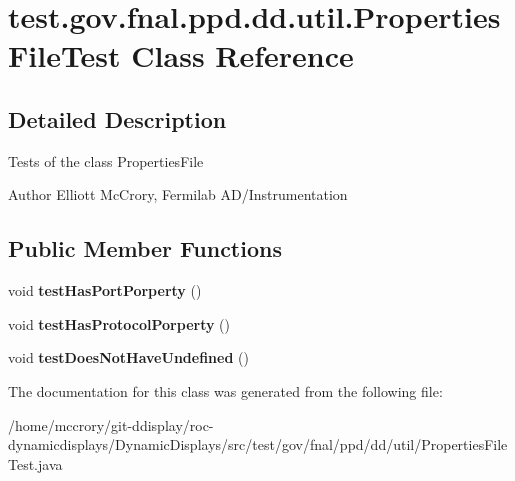 \hypertarget{classtest_1_1gov_1_1fnal_1_1ppd_1_1dd_1_1util_1_1PropertiesFileTest}{\section{test.\-gov.\-fnal.\-ppd.\-dd.\-util.\-Properties\-File\-Test Class Reference}
\label{classtest_1_1gov_1_1fnal_1_1ppd_1_1dd_1_1util_1_1PropertiesFileTest}
}


\subsection{Detailed Description}
Tests of the class Properties\-File

\begin{DoxyAuthor}{Author}
Elliott Mc\-Crory, Fermilab A\-D/\-Instrumentation 
\end{DoxyAuthor}
\subsection*{Public Member Functions}
\begin{DoxyCompactItemize}
\item 
\hypertarget{classtest_1_1gov_1_1fnal_1_1ppd_1_1dd_1_1util_1_1PropertiesFileTest_a8cfbcf6b00fd010a729a7c465d76de77}{void {\bfseries test\-Has\-Port\-Porperty} ()}\label{classtest_1_1gov_1_1fnal_1_1ppd_1_1dd_1_1util_1_1PropertiesFileTest_a8cfbcf6b00fd010a729a7c465d76de77}

\item 
\hypertarget{classtest_1_1gov_1_1fnal_1_1ppd_1_1dd_1_1util_1_1PropertiesFileTest_a111ec29545acfcabc893f8061864db6a}{void {\bfseries test\-Has\-Protocol\-Porperty} ()}\label{classtest_1_1gov_1_1fnal_1_1ppd_1_1dd_1_1util_1_1PropertiesFileTest_a111ec29545acfcabc893f8061864db6a}

\item 
\hypertarget{classtest_1_1gov_1_1fnal_1_1ppd_1_1dd_1_1util_1_1PropertiesFileTest_a81f9e60cdf7be477c8bfa619f600e4b4}{void {\bfseries test\-Does\-Not\-Have\-Undefined} ()}\label{classtest_1_1gov_1_1fnal_1_1ppd_1_1dd_1_1util_1_1PropertiesFileTest_a81f9e60cdf7be477c8bfa619f600e4b4}

\end{DoxyCompactItemize}


The documentation for this class was generated from the following file\-:\begin{DoxyCompactItemize}
\item 
/home/mccrory/git-\/ddisplay/roc-\/dynamicdisplays/\-Dynamic\-Displays/src/test/gov/fnal/ppd/dd/util/Properties\-File\-Test.\-java\end{DoxyCompactItemize}

